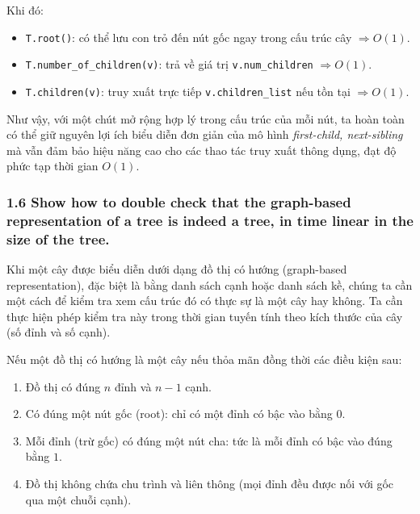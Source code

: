 \documentclass{article}
\begin{document}
	Khi đó:
	
	\begin{itemize}
		\item \texttt{T.root()}: có thể lưu con trỏ đến nút gốc ngay trong cấu trúc cây $\Rightarrow O(1)$.
		\item \texttt{T.number\_of\_children(v)}: trả về giá trị \texttt{v.num\_children} $\Rightarrow O(1)$.
		\item \texttt{T.children(v)}: truy xuất trực tiếp \texttt{v.children\_list} nếu tồn tại $\Rightarrow O(1)$.
	\end{itemize}
	
	\vspace{0.5em}
	Như vậy, với một chút mở rộng hợp lý trong cấu trúc của mỗi nút, ta hoàn toàn có thể giữ nguyên lợi ích biểu diễn đơn giản của mô hình \textit{first-child, next-sibling} mà vẫn đảm bảo hiệu năng cao cho các thao tác truy xuất thông dụng, đạt độ phức tạp thời gian $O(1)$.
	
	\subsubsection*{1.6 Show how to double check that the graph-based representation of a tree is indeed a tree, in time linear in the size of the tree.}
	
	Khi một cây được biểu diễn dưới dạng đồ thị có hướng (graph-based representation), đặc biệt là bằng danh sách cạnh hoặc danh sách kề, chúng ta cần một cách để kiểm tra xem cấu trúc đó có thực sự là một cây hay không. Ta cần thực hiện phép kiểm tra này trong thời gian tuyến tính theo kích thước của cây (số đỉnh và số cạnh).
	
	\vspace{1em}
	Nếu một đồ thị có hướng là một cây nếu thỏa mãn đồng thời các điều kiện sau:
	
	\begin{enumerate}
		\item Đồ thị có đúng $n$ đỉnh và $n-1$ cạnh.
		\item Có đúng một nút gốc (root): chỉ có một đỉnh có bậc vào bằng $0$.
		\item Mỗi đỉnh (trừ gốc) có đúng một nút cha: tức là mỗi đỉnh có bậc vào đúng bằng $1$.
		\item Đồ thị không chứa chu trình và liên thông (mọi đỉnh đều được nối với gốc qua một chuỗi cạnh).
	\end{enumerate}
	
	\vspace{1em}
	
\end{document}
